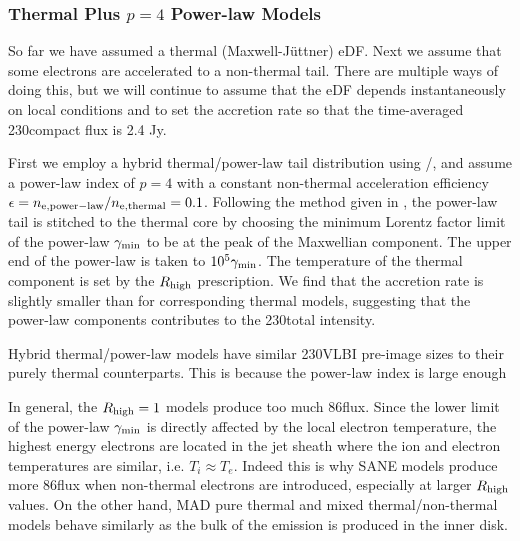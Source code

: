 \subsubsection{Thermal Plus \texorpdfstring{$p = 4$}{p=4} Power-law Models}

So far we have assumed a thermal (Maxwell-J{\"u}ttner) eDF.  Next we assume that some electrons are accelerated to a non-thermal tail.  There are multiple ways of doing this, but we will continue to assume that the eDF depends instantaneously on local conditions and to set the accretion rate so that the time-averaged 230\GHz compact flux is 2.4 Jy.

First we employ a hybrid thermal/power-law tail distribution using \hamr/\bhoss, and assume a power-law index of $p=4$ with a constant non-thermal acceleration efficiency $\epsilon=n_{\rm e, power-law}/n_{\rm e, thermal}=0.1$. Following the method given in \citet{Chatterjee2021}, the power-law tail is stitched to the thermal core by choosing the minimum Lorentz factor limit of the power-law $\gamma_{\rm min}$ to be at the peak of the Maxwellian component. The upper end of the power-law is taken to $10^5 \gamma_{\rm min}$.  The temperature of the thermal component is set by the $R_\mathrm{high}$ prescription.  We find that the accretion rate is slightly smaller than for corresponding thermal models, suggesting that the power-law components contributes to the 230\GHz total intensity.


Hybrid thermal/power-law models have similar 230\GHz VLBI pre-image sizes to their purely thermal counterparts. This is because the power-law index is large enough


In general, the $R_{\rm high}=1$ models produce too much 86\GHz flux. Since the lower limit of the power-law $\gamma_{\rm min}$ is directly affected by the local electron temperature, the highest energy electrons are located in the jet sheath where the ion and electron temperatures are similar, i.e. $T_i\approx T_e$. Indeed this is why SANE models produce more 86\GHz flux when non-thermal electrons are introduced, especially at larger $R_{\rm high}$ values. On the other hand, MAD pure thermal and mixed thermal/non-thermal models behave similarly as the bulk of the emission is produced in the inner disk.

